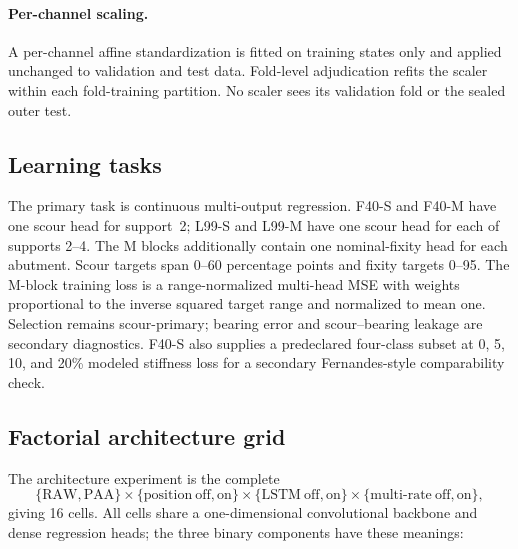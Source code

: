 \paragraph{Per-channel scaling.}
A per-channel affine standardization is fitted on training states only and
applied unchanged to validation and test data. Fold-level adjudication refits
the scaler within each fold-training partition. No scaler sees its validation
fold or the sealed outer test.

\subsection{Learning tasks}
\label{sec:task}

The primary task is continuous multi-output regression. F40-S and F40-M have
one scour head for support~2; L99-S and L99-M have one scour head for each of
supports 2--4. The M blocks additionally contain one nominal-fixity head for
each abutment. Scour targets span 0--60 percentage points and fixity targets
0--95. The M-block training loss is a range-normalized multi-head MSE with
weights proportional to the inverse squared target range and normalized to
mean one. Selection remains scour-primary; bearing error and
scour--bearing leakage are secondary diagnostics. F40-S also supplies a
predeclared four-class subset at 0, 5, 10, and 20\% modeled stiffness loss for
a secondary Fernandes-style comparability check.

\subsection{Factorial architecture grid}
\label{sec:architectures}

The architecture experiment is the complete
\[
  \{\mathrm{RAW},\mathrm{PAA}\}
  \times\{\mathrm{position\ off,on}\}
  \times\{\mathrm{LSTM\ off,on}\}
  \times\{\mathrm{multi\!\mbox{-}\!rate\ off,on}\},
\]
giving 16 cells. All cells share a one-dimensional convolutional backbone and
dense regression heads; the three binary components have these meanings:

